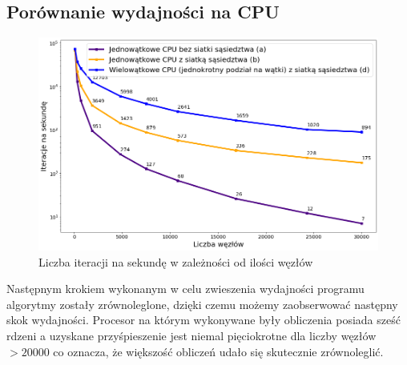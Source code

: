 \documentclass[12pt, letterpaper]{report}
\begin{document}
    \subsection{Porównanie wydajności na CPU}
    \begin{figure}[H]
        \centering
        \includegraphics[width=18cm]{performance_cpu_best_worst.png}
        \caption{
            Liczba iteracji na sekundę w zależności od ilości węzłów
        }
    \end{figure}
    Następnym krokiem wykonanym w celu zwieszenia wydajności programu algorytmy zostały 
    zrównoleglone, dzięki czemu możemy zaobserwować następny skok wydajności. Procesor na którym 
    wykonywane były obliczenia posiada sześć rdzeni a uzyskane przyśpieszenie jest niemal pięciokrotne
    dla liczby węzłów $>20000$ co oznacza, że większość obliczeń udało się skutecznie zrównoleglić.

\end{document}
